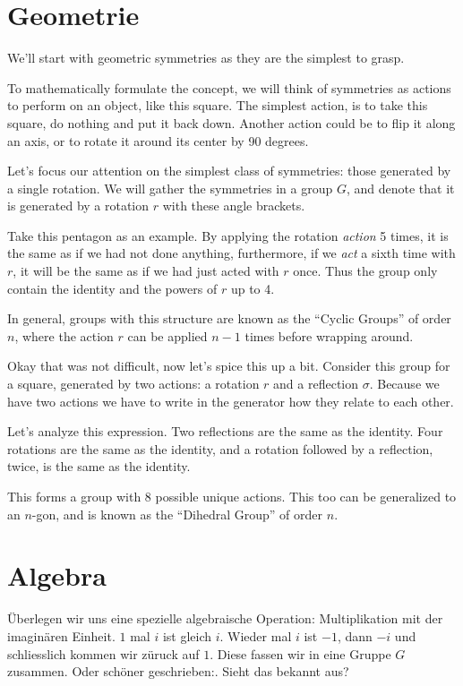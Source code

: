 \documentclass[a4paper]{article}
\newcommand{\scene}[1]{\par\noindent[ #1 ]\par}
\newenvironment{totranslate}{\color{blue!70!black}}{}
\begin{document}
\section{Geometrie}
\begin{totranslate}
We'll start with geometric symmetries as they are the simplest to grasp.

\scene{Intro}
  To mathematically formulate the concept, we will think of symmetries as
  actions to perform on an object, like this square. The simplest action, is to
  take this square, do nothing and put it back down. Another action could be to
  flip it along an axis, or to rotate it around its center by 90 degrees.

\scene{Cyclic Groups}
  Let's focus our attention on the simplest class of symmetries: those
  generated by a single rotation. We will gather the symmetries in a group
  \(G\), and denote that it is generated by a rotation \(r\) with these angle
  brackets.
  
  Take this pentagon as an example. By applying the rotation \emph{action} 5
  times, it is the same as if we had not done anything, furthermore, if we
  \emph{act} a sixth time with \(r\), it will be the same as if we had just
  acted with \(r\) once.  Thus the group only contain the identity and the
  powers of \(r\) up to 4.
  
  In general, groups with this structure are known as the ``Cyclic Groups'' of
  order \(n\), where the action \(r\) can be applied \(n-1\) times before
  wrapping around. 


\scene{Dihedral Groups}
  Okay that was not difficult, now let's spice this up a bit. Consider this
  group for a square, generated by two actions: a rotation \(r\) and a
  reflection \(\sigma\). Because we have two actions we have to write in the
  generator how they relate to each other.

  Let's analyze this expression. Two reflections are the same as the identity.
  Four rotations are the same as the identity, and a rotation followed by a
  reflection, twice, is the same as the identity.

  This forms a group with 8 possible unique actions. This too can be generalized
  to an \(n\)-gon, and is known as the ``Dihedral Group'' of order \(n\).
\end{totranslate}

\section{Algebra}
\scene{Produkt mit \(i\)}
\"Uberlegen wir uns eine spezielle algebraische Operation: Multiplikation mit
der imagin\"aren Einheit. \(1\) mal \(i\) ist gleich \(i\). Wieder mal \(i\)
ist \(-1\), dann \(-i\) und schliesslich kommen wir z\"uruck auf \(1\).  Diese
fassen wir in eine Gruppe \(G\) zusammen. Oder sch\"oner geschrieben:. Sieht das
bekannt aus?
\end{document}
